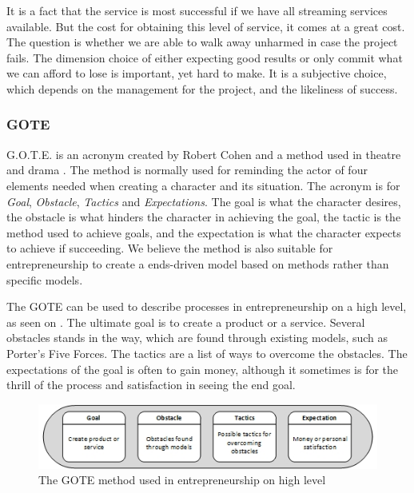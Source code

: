 It is a fact that the service is most successful if we have all streaming services available. But the cost for obtaining this level of service, it comes at a great cost. The question is whether we are able to walk away unharmed in case the project fails. The dimension choice of either expecting good results or only commit what we can afford to lose is important, yet hard to make. It is a subjective choice, which depends on the management for the project, and the likeliness of success.

\subsubsection*{GOTE}
G.O.T.E. is an acronym created by Robert Cohen and a method used in theatre and drama \cite{gote}. The method is normally used for reminding the actor of four elements needed when creating a character and its situation. The acronym is for \emph{Goal}, \emph{Obstacle}, \emph{Tactics} and \emph{Expectations}. The goal is what the character desires, the obstacle is what hinders the character in achieving the goal, the tactic is the method used to achieve goals, and the expectation is what the character expects to achieve if succeeding. We believe the method is also suitable for entrepreneurship to create a ends-driven model based on methods rather than specific models.

The GOTE can be used to describe processes in entrepreneurship on a high level, as seen on . The ultimate goal is to create a product or a service. Several obstacles stands in the way, which are found through existing models, such as Porter's Five Forces. The tactics are a list of ways to overcome the obstacles. The expectations of the goal is often to gain money, although it sometimes is for the thrill of the process and satisfaction in seeing the end goal.

\begin{figure}[h]
\begin{center}
\includegraphics[scale=0.7]{./pics/gote}
\caption{The GOTE method used in entrepreneurship on high level}
\label{fig:gote}
\end{center}
\end{figure}

